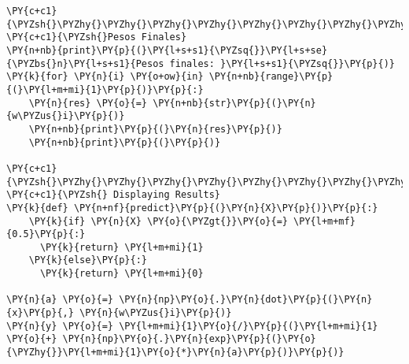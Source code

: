     \begin{tcolorbox}[breakable, size=fbox, boxrule=1pt, pad at break*=1mm,colback=cellbackground, colframe=cellborder]
\begin{Verbatim}[commandchars=\\\{\}]
\PY{c+c1}{\PYZsh{}\PYZhy{}\PYZhy{}\PYZhy{}\PYZhy{}\PYZhy{}\PYZhy{}\PYZhy{}\PYZhy{}\PYZhy{}\PYZhy{}\PYZhy{}\PYZhy{}\PYZhy{}\PYZhy{}\PYZhy{}\PYZhy{}\PYZhy{}\PYZhy{}\PYZhy{}\PYZhy{}\PYZhy{}\PYZhy{}\PYZhy{}\PYZhy{}\PYZhy{}\PYZhy{}\PYZhy{}\PYZhy{}\PYZhy{}\PYZhy{}\PYZhy{}\PYZhy{}\PYZhy{}\PYZhy{}\PYZhy{}\PYZhy{}\PYZhy{}\PYZhy{}\PYZhy{}\PYZhy{}\PYZhy{}\PYZhy{}\PYZhy{}\PYZhy{}\PYZhy{}\PYZhy{}\PYZhy{}\PYZhy{}\PYZhy{}\PYZhy{}\PYZhy{}\PYZhy{}\PYZhy{}\PYZhy{}\PYZhy{}\PYZhy{}\PYZhy{}\PYZhy{}\PYZhy{}\PYZhy{}\PYZhy{}\PYZhy{}\PYZhy{}\PYZhy{}\PYZhy{}\PYZhy{}}
\PY{c+c1}{\PYZsh{}Pesos Finales}
\PY{n+nb}{print}\PY{p}{(}\PY{l+s+s1}{\PYZsq{}}\PY{l+s+se}{\PYZbs{}n}\PY{l+s+s1}{Pesos finales: }\PY{l+s+s1}{\PYZsq{}}\PY{p}{)}
\PY{k}{for} \PY{n}{i} \PY{o+ow}{in} \PY{n+nb}{range}\PY{p}{(}\PY{l+m+mi}{1}\PY{p}{)}\PY{p}{:}
    \PY{n}{res} \PY{o}{=} \PY{n+nb}{str}\PY{p}{(}\PY{n}{w\PYZus{}i}\PY{p}{)}
    \PY{n+nb}{print}\PY{p}{(}\PY{n}{res}\PY{p}{)}
    \PY{n+nb}{print}\PY{p}{(}\PY{p}{)}

\PY{c+c1}{\PYZsh{}\PYZhy{}\PYZhy{}\PYZhy{}\PYZhy{}\PYZhy{}\PYZhy{}\PYZhy{}\PYZhy{}\PYZhy{}\PYZhy{}\PYZhy{}\PYZhy{}\PYZhy{}\PYZhy{}\PYZhy{}\PYZhy{}\PYZhy{}\PYZhy{}\PYZhy{}\PYZhy{}\PYZhy{}\PYZhy{}\PYZhy{}\PYZhy{}\PYZhy{}\PYZhy{}\PYZhy{}\PYZhy{}\PYZhy{}\PYZhy{}\PYZhy{}\PYZhy{}\PYZhy{}\PYZhy{}\PYZhy{}\PYZhy{}\PYZhy{}\PYZhy{}\PYZhy{}\PYZhy{}\PYZhy{}\PYZhy{}\PYZhy{}\PYZhy{}\PYZhy{}\PYZhy{}\PYZhy{}\PYZhy{}\PYZhy{}\PYZhy{}\PYZhy{}\PYZhy{}\PYZhy{}\PYZhy{}\PYZhy{}\PYZhy{}\PYZhy{}\PYZhy{}\PYZhy{}\PYZhy{}\PYZhy{}\PYZhy{}\PYZhy{}\PYZhy{}\PYZhy{}\PYZhy{}}
\PY{c+c1}{\PYZsh{} Displaying Results}
\PY{k}{def} \PY{n+nf}{predict}\PY{p}{(}\PY{n}{X}\PY{p}{)}\PY{p}{:}
    \PY{k}{if} \PY{n}{X} \PY{o}{\PYZgt{}}\PY{o}{=} \PY{l+m+mf}{0.5}\PY{p}{:}
      \PY{k}{return} \PY{l+m+mi}{1}
    \PY{k}{else}\PY{p}{:}
      \PY{k}{return} \PY{l+m+mi}{0}

\PY{n}{a} \PY{o}{=} \PY{n}{np}\PY{o}{.}\PY{n}{dot}\PY{p}{(}\PY{n}{x}\PY{p}{,} \PY{n}{w\PYZus{}i}\PY{p}{)}
\PY{n}{y} \PY{o}{=} \PY{l+m+mi}{1}\PY{o}{/}\PY{p}{(}\PY{l+m+mi}{1} \PY{o}{+} \PY{n}{np}\PY{o}{.}\PY{n}{exp}\PY{p}{(}\PY{o}{\PYZhy{}}\PY{l+m+mi}{1}\PY{o}{*}\PY{n}{a}\PY{p}{)}\PY{p}{)}


\end{Verbatim}
\end{tcolorbox}
